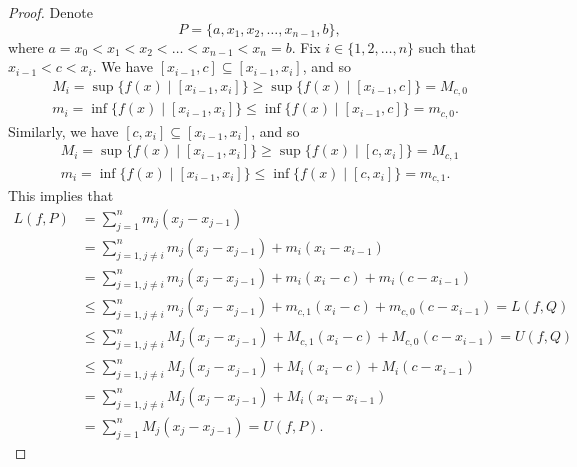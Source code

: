 \documentclass[a4paper, openany]{memoir}
\theoremstyle{definition}
\theoremstyle{plain}
\begin{document}
\begin{proof}
Denote
\[P = \{a, x_1, x_2, \dots, x_{n-1}, b\},\]
where $a = x_0 < x_1 < x_2 < \dots < x_{n-1} < x_n = b$. Fix $i \in \{1, 2, \dots, n\}$ such that $x_{i-1} < c < x_i$. We have $[x_{i-1}, c] \subseteq [x_{i-1}, x_i]$, and so
\begin{align*}
    M_i = \sup \{f(x) \mid [x_{i-1}, x_i]\} \geqslant \sup \{f(x) \mid [x_{i-1}, c]\} = M_{c, 0} \\
    m_i = \inf \{f(x) \mid [x_{i-1}, x_i]\} \leqslant \inf \{f(x) \mid [x_{i-1}, c]\} = m_{c, 0}.
\end{align*}
Similarly, we have $[c, x_i] \subseteq [x_{i-1}, x_i]$, and so
\begin{align*}
    M_i = \sup \{f(x) \mid [x_{i-1}, x_i]\} \geqslant \sup \{f(x) \mid [c, x_i]\} = M_{c, 1} \\
    m_i = \inf \{f(x) \mid [x_{i-1}, x_i]\} \leqslant \inf \{f(x) \mid [c, x_i]\} = m_{c, 1}.
\end{align*}
This implies that
\begin{align*}
    L(f, P) &= \sum_{j=1}^n m_j(x_j - x_{j-1}) \\
    &= \sum_{j=1, j \neq i}^n m_j(x_j - x_{j-1}) + m_i (x_i - x_{i-1}) \\
    &= \sum_{j=1, j \neq i}^n m_j(x_j - x_{j-1}) + m_i (x_i - c) + m_i(c - x_{i-1}) \\
    &\leqslant \sum_{j=1, j \neq i}^n m_j(x_j - x_{j-1}) + m_{c, 1}(x_i - c) + m_{c, 0}(c - x_{i-1}) = L(f, Q) \\
    &\leqslant \sum_{j=1, j \neq i}^n M_j(x_j - x_{j-1}) + M_{c, 1}(x_i - c) + M_{c, 0}(c - x_{i-1}) = U(f, Q) \\
    &\leqslant \sum_{j=1, j \neq i}^n M_j(x_j - x_{j-1}) + M_i(x_i - c) + M_i(c - x_{i-1}) \\
    &= \sum_{j=1, j \neq i}^n M_j(x_j - x_{j-1}) + M_i(x_i - x_{i-1}) \\
    &= \sum_{j=1}^n M_j(x_j - x_{j-1}) = U(f, P).
\end{align*}
\end{proof}
\end{document}

